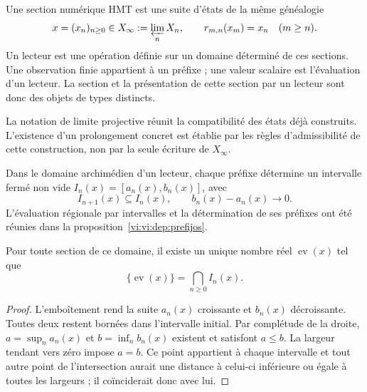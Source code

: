 \begin{definition}
Une section numérique HMT est une suite d’états de la même généalogie
\begin{equation}
 x=(x_n)_{n\ge0}\in X_\infty:=\varprojlim_n X_n,
 \qquad r_{m,n}(x_m)=x_n\quad(m\ge n).
 \label{vi:vi:hist:limite-inverso}
\end{equation}
Un lecteur est une opération définie sur un domaine déterminé de ces
sections. Une observation finie appartient à un préfixe ; une valeur scalaire
est l’évaluation d’un lecteur. La section et la présentation de cette section
par un lecteur sont donc des objets de types distincts.
\end{definition}

La notation de limite projective réunit la compatibilité des états déjà
construits. L’existence d’un prolongement concret est établie
par les règles d’admissibilité de cette construction, non par la
seule écriture de \(X_\infty\).

Dans le domaine archimédien d’un lecteur, chaque préfixe détermine un
intervalle fermé non vide \(I_n(x)=[a_n(x),b_n(x)]\), avec
\begin{equation}
 I_{n+1}(x)\subseteq I_n(x),\qquad
 b_n(x)-a_n(x)\longrightarrow0.
 \label{vi:vi:hist:cilindros}
\end{equation}
L’évaluation régionale par intervalles et la détermination de ses préfixes ont
été réunies dans la proposition~\ref{vi:vi:dep:prefijos}.

\begin{proposition}
Pour toute section de ce domaine, il existe un unique nombre réel
\(\operatorname{ev}(x)\) tel que
\begin{equation}
 \{\operatorname{ev}(x)\}=\bigcap_{n\ge0}I_n(x).
 \label{vi:vi:hist:evaluacion}
\end{equation}
\end{proposition}
\begin{proof}
L’emboîtement rend la suite \(a_n(x)\) croissante et
\(b_n(x)\) décroissante. Toutes deux restent bornées dans l’intervalle initial. Par
complétude de la droite, \(a=\sup_n a_n(x)\) et
\(b=\inf_n b_n(x)\) existent et satisfont \(a\le b\).
La largeur tendant vers zéro impose \(a=b\). Ce point appartient à chaque
intervalle et tout autre point de l’intersection aurait une distance à
celui-ci inférieure ou égale à toutes les largeurs ; il coïnciderait donc avec lui.
\end{proof}

